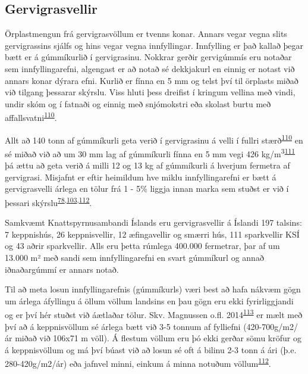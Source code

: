 \documentclass[icelandic,]{book}
\begin{document}
\hypertarget{gervigrasvellir}{%
\subsection*{Gervigrasvellir}\label{gervigrasvellir}}

Örplastmengun frá gervigrasvöllum er tvenns konar. Annars vegar vegna slits gervigrassins sjálfs og hins vegar vegna innfyllingar. Innfylling er það kallað þegar bætt er á gúmmíkurlið í gervigrasinu. Nokkrar gerðir gervigúmmís eru notaðar sem innfyllingarefni, algengast er að notað sé dekkjakurl en einnig er notast við annars konar dýrara efni. Kurlið er fínna en 5 mm og telst því til örplasts miðað við tilgang þessarar skýrslu. Viss hluti þess dreifist í kringum vellina með vindi, undir skóm og í fatnaði og einnig með snjómokstri eða skolast burtu með affallsvatni\textsuperscript{\protect\hyperlink{ref-Wredh2014}{110}}.

Allt að 140 tonn af gúmmíkurli geta verið í gervigrasinu á velli í fullri stærð\textsuperscript{\protect\hyperlink{ref-Wredh2014}{110}} en sé miðað við að um 30 mm lag af gúmmíkurli fínna en 5 mm vegi 426 kg/m\textsuperscript{3}\textsuperscript{\protect\hyperlink{ref-Gamalath2016}{111}} þá ættu að geta verið á milli 12 og 13 kg af gúmmíkurli á hverjum fermetra af gervigrasi. Misjafnt er eftir heimildum hve miklu innfyllingarefni er bætt á gervigrasvelli árlega en tölur frá 1 - 5\% liggja innan marka sem stuðst er við í þessari skýrslu\textsuperscript{\protect\hyperlink{ref-lassen2015microplastics}{78},\protect\hyperlink{ref-Hann2018}{103},\protect\hyperlink{ref-magnusson2016swedish}{112}}.

Samkvæmt Knattspyrnusambandi Íslands eru gervigrasvellir á Íslandi 197 talsins: 7 keppnishús, 26 keppnisvellir, 12 æfingavellir og smærri hús, 111 sparkvellir KSÍ og 43 aðrir sparkvellir. Alls eru þetta rúmlega 400.000 fermetrar, þar af um 13.000 m² með sandi sem innfyllingarefni en svart gúmmíkurl og annað iðnaðargúmmí er annars notað.

Til að meta losun innfyllingarefnis (gúmmíkurls) væri best að hafa nákvæm gögn um árlega áfyllingu á öllum völlum landsins en þau gögn eru ekki fyrirliggjandi og er því hér stuðst við áætlaðar tölur. Skv. Magnussen o.fl. 2014\textsuperscript{\protect\hyperlink{ref-magnusson2014mikroskrap}{113}} er mælt með því að á keppnisvöllum sé árlega bætt við 3-5 tonnum af fylliefni (420-700g/m2/ár miðað við 106x71 m völl). Á flestum völlum eru þó ekki gerðar sömu kröfur og á keppnisvöllum og má því búast við að losun sé oft á bilinu 2-3 tonn á ári (þ.e. 280-420g/m2/ár) eða jafnvel minni, einkum á minna notuðum völlum\textsuperscript{\protect\hyperlink{ref-magnusson2016swedish}{112}}.
\end{document}
